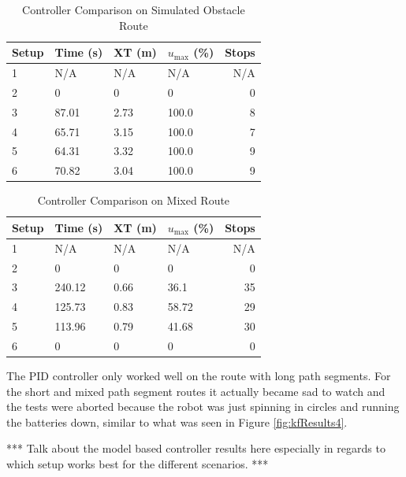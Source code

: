 \begin{table}[ht!]
\caption{Controller Comparison on Simulated Obstacle Route}
\small
\centering
\begin{tabular}{@{}llllr@{}} \toprule
Setup & Time (s) & XT (m) & $u_{\text{max}}$ (\%) & Stops \\ \midrule
1     & N/A      & N/A    & N/A                   & N/A   \\
2     & 0        & 0      & 0                     & 0     \\
3     & 87.01    & 2.73   & 100.0                 & 8     \\
4     & 65.71    & 3.15   & 100.0                 & 7     \\
5     & 64.31    & 3.32   & 100.0                 & 9     \\
6     & 70.82    & 3.04   & 100.0                 & 9     \\ \bottomrule
\end{tabular}
\label{tab:resultsControllersObstacles}
\end{table}

\begin{table}[ht!]
\caption{Controller Comparison on Mixed Route}
\small
\centering
\begin{tabular}{@{}llllr@{}} \toprule
Setup & Time (s) & XT (m) & $u_{\text{max}}$ (\%) & Stops \\ \midrule
1     & N/A      & N/A    & N/A                   & N/A   \\
2     & 0        & 0      & 0                     & 0     \\
3     & 240.12   & 0.66   & 36.1                  & 35    \\
4     & 125.73   & 0.83   & 58.72                 & 29    \\
5     & 113.96   & 0.79   & 41.68                 & 30    \\
6     & 0        & 0      & 0                     & 0     \\ \bottomrule
\end{tabular}
\label{tab:resultsControllersMixed}
\end{table}

The PID controller only worked well on the route with long path segments. For the short and mixed path segment routes it actually became sad to watch and the tests were aborted because the robot was just spinning in circles and running the batteries down, similar to what was seen in Figure \ref{fig:kfResults4}.

*** Talk about the model based controller results here especially in regards to which setup works best for the different scenarios. ***
